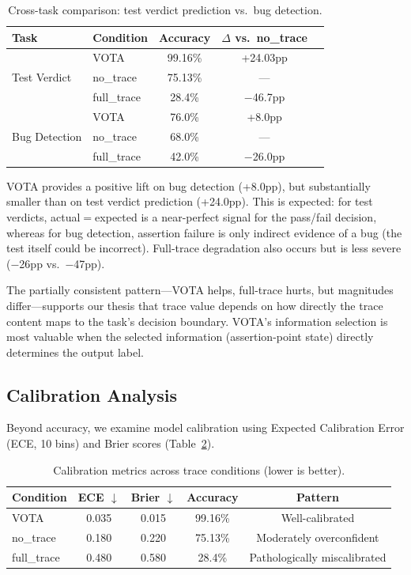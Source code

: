 \documentclass[11pt]{article}
\begin{document}
\begin{table}[h]
\centering
\caption{Cross-task comparison: test verdict prediction vs.\ bug detection.}
\label{tab:crosstask}
\begin{tabular}{llccc}
\toprule
\textbf{Task} & \textbf{Condition} & \textbf{Accuracy} & \textbf{$\Delta$ vs.\ no\_trace} \\
\midrule
\multirow{3}{*}{Test Verdict}  & VOTA       & 99.16\% & +24.03pp  \\
                               & no\_trace  & 75.13\% & ---       \\
                               & full\_trace & 28.4\% & $-$46.7pp \\
\midrule
\multirow{3}{*}{Bug Detection} & VOTA       & 76.0\%  & +8.0pp    \\
                               & no\_trace  & 68.0\%  & ---       \\
                               & full\_trace & 42.0\% & $-$26.0pp \\
\bottomrule
\end{tabular}
\end{table}

VOTA provides a positive lift on bug detection (+8.0pp), but substantially smaller than on test verdict prediction (+24.0pp). This is expected: for test verdicts, actual$=$expected is a near-perfect signal for the pass/fail decision, whereas for bug detection, assertion failure is only indirect evidence of a bug (the test itself could be incorrect). Full-trace degradation also occurs but is less severe ($-$26pp vs.\ $-$47pp).

The partially consistent pattern---VOTA helps, full-trace hurts, but magnitudes differ---supports our thesis that trace value depends on how directly the trace content maps to the task's decision boundary. VOTA's information selection is most valuable when the selected information (assertion-point state) directly determines the output label.

\subsection{Calibration Analysis}
\label{sec:calibration}

Beyond accuracy, we examine model calibration using Expected Calibration Error (ECE, 10 bins) and Brier scores (Table~\ref{tab:calibration}).

\begin{table}[h]
\centering
\caption{Calibration metrics across trace conditions (lower is better).}
\label{tab:calibration}
\begin{tabular}{lcccc}
\toprule
\textbf{Condition} & \textbf{ECE $\downarrow$} & \textbf{Brier $\downarrow$} & \textbf{Accuracy} & \textbf{Pattern} \\
\midrule
VOTA        & 0.035 & 0.015 & 99.16\% & Well-calibrated \\
no\_trace   & 0.180 & 0.220 & 75.13\% & Moderately overconfident \\
full\_trace & 0.480 & 0.580 & 28.4\%  & Pathologically miscalibrated \\
\bottomrule
\end{tabular}
\end{table}
\end{document}
